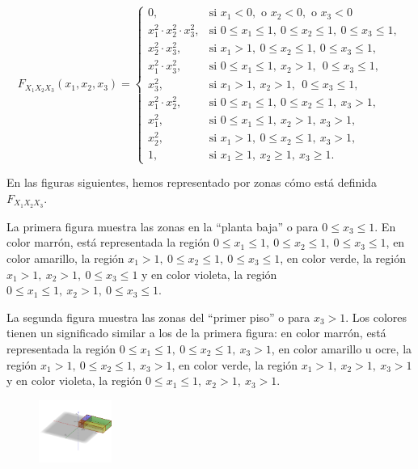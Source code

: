 \documentclass[
  letterpaper,
  DIV=11,
  numbers=noendperiod]{scrreprt}
\begin{document}
\[
F_{X_1X_2X_3}(x_1,x_2,x_3)=\begin{cases}
0, & \mbox{si }x_1<0,\mbox{ o }x_2<0,\mbox{ o }x_3 <0\\
x_1^2\cdot x_2^2\cdot x_3^2, & \mbox{si }0\leq x_1\leq 1,\ 0\leq x_2\leq 1,\ 0\leq x_3\leq 1, \\
 x_2^2\cdot x_3^2, & \mbox{si }x_1> 1,\ 0\leq x_2\leq  1,\ 0\leq x_3\leq  1, \\
 x_1^2\cdot x_3^2, & \mbox{si }0\leq x_1\leq  1,\ x_2> 1,\ \ 0\leq x_3\leq  1, \\
 x_3^2, & \mbox{si }x_1> 1,\ x_2> 1,\ \ 0\leq x_3\leq  1, \\
 x_1^2\cdot x_2^2, & \mbox{si }0\leq x_1\leq  1,\ 0\leq x_2\leq  1,\ x_3> 1,\\
 x_1^2, & \mbox{si }0\leq x_1\leq  1,\ x_2 >  1,\ x_3> 1,\\
 x_2^2, & \mbox{si }x_1>1,\ 0\leq x_2\leq  1,\ x_3> 1,\\
1, & \mbox{si }x_1\geq 1,\ x_2\geq 1,\ x_3\geq 1.
\end{cases}
\]

En las figuras siguientes, hemos representado por zonas cómo está
definida \(F_{X_1X_2X_3}\).

La primera figura muestra las zonas en la ``planta baja'' o para
\(0\leq x_3\leq 1\). En color marrón, está representada la región
\(0\leq x_1\leq 1,\ 0\leq x_2\leq 1,\ 0\leq x_3\leq 1\), en color
amarillo, la región \(x_1> 1,\ 0\leq x_2\leq 1,\ 0\leq x_3\leq 1\), en
color verde, la región \(x_1>1,\ x_2>1,\ 0\leq x_3\leq 1\) y en color
violeta, la región \(0\leq x_1\leq 1,\ x_2>1,\ 0\leq x_3\leq 1\).

La segunda figura muestra las zonas del ``primer piso'' o para
\(x_3>1\). Los colores tienen un significado similar a los de la primera
figura: en color marrón, está representada la región
\(0\leq x_1\leq 1,\ 0\leq x_2\leq 1,\  x_3> 1\), en color amarillo u
ocre, la región \(x_1> 1,\ 0\leq x_2\leq 1,\ x_3> 1\), en color verde,
la región \(x_1>1,\ x_2>1,\ x_3> 1\) y en color violeta, la región
\(0\leq x_1\leq 1,\ x_2>1,\ x_3> 1\).

\begin{figure}

{\centering \includegraphics[width=0.94in,height=\textheight]{Images/Ej3DFxyz.png}

}

\end{figure}
\end{document}
